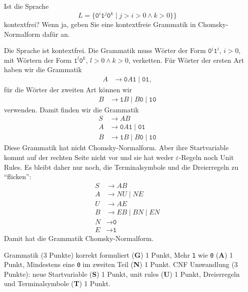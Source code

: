 Ist die Sprache
\[
L=
\{
\texttt{0}^i \texttt{1}^j\texttt{0}^k\mid  j> i>0\wedge k>0\}
\}
\]
kontextfrei?
Wenn ja, geben Sie eine kontextfreie Grammatik in Chomsky-Normalform dafür an.


\begin{loesung}
Die Sprache ist kontextfrei.
Die Grammatik muss Wörter der Form $\texttt{0}^i\texttt{1}^i$, $i>0$, mit
Wörtern der Form $\texttt{1}^l\texttt{0}^k$, $l>0\wedge k>0$, verketten.
Für Wörter der ersten Art haben wir die Grammatik
\begin{align*}
A&\to \texttt{0}A\texttt{1} \mid  \texttt{01},
\end{align*}
für die Wörter der zweiten Art können wir
\begin{align*}
B&\to \texttt{1} B \mid  B\texttt{0} \mid  \texttt{10}
\end{align*}
verwenden.
Damit finden wir die Grammatik
\begin{align*}
S&\to AB
\\
A&\to \texttt{0}A\texttt{1} \mid  \texttt{01}
\\ 
B&\to \texttt{1}B \mid  B\texttt{0} \mid  \texttt{10}
\end{align*}
Diese Grammatik hat nicht Chomsky-Normalform.
Aber ihre Startvariable kommt auf der rechten Seite nicht vor und
sie hat weder $\varepsilon$-Regeln noch Unit Rules.
Es bleibt daher nur noch, die Terminalsymbole und die Dreierregeln
zu ``flicken'':
\begin{align*}
S&\to AB
\\
A&\to NU \mid  NE
\\
U&\to AE
\\ 
B&\to EB \mid  BN \mid  EN
\\
N&\to \texttt{0}
\\
E&\to \texttt{1}
\end{align*}
Damit hat die Grammatik Chomsky-Normalform.
\end{loesung}

\begin{bewertung}
Grammatik (3 Punkte) korrekt formuliert ({\bf G}) 1 Punkt,
Mehr \texttt{1} wie \texttt{0} ({\bf A}) 1 Punkt,
Mindestens eine \texttt{0} im zweiten Teil ({\bf N}) 1 Punkt.
CNF Umwandlung (3 Punkte): neue Startvariable ({\bf S}) 1 Punkt,
unit rules ({\bf U}) 1 Punkt,
Dreierregeln und Terminalsymbole ({\bf T}) 1 Punkt.
\end{bewertung}
